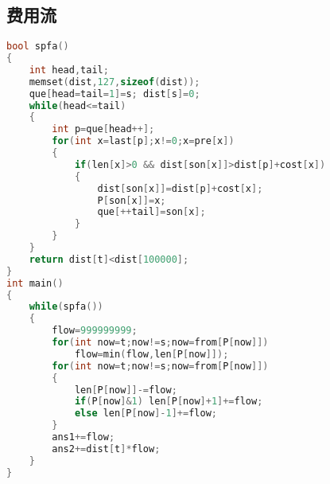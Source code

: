 \subsection{费用流}
    \begin{lstlisting}[language=c++]
bool spfa()
{
    int head,tail;
	memset(dist,127,sizeof(dist));	
	que[head=tail=1]=s; dist[s]=0;
	while(head<=tail)
	{
		int p=que[head++];
		for(int x=last[p];x!=0;x=pre[x])
		{
			if(len[x]>0 && dist[son[x]]>dist[p]+cost[x])
			{
				dist[son[x]]=dist[p]+cost[x];
				P[son[x]]=x;
				que[++tail]=son[x];	
			}	
		}	
	}
	return dist[t]<dist[100000];
}
int main()
{
	while(spfa())
	{
		flow=999999999;
		for(int now=t;now!=s;now=from[P[now]])
			flow=min(flow,len[P[now]]);
		for(int now=t;now!=s;now=from[P[now]])
		{
			len[P[now]]-=flow;	
			if(P[now]&1) len[P[now]+1]+=flow;
			else len[P[now]-1]+=flow;
		}
		ans1+=flow;
		ans2+=dist[t]*flow;
	}
}
    \end{lstlisting}

